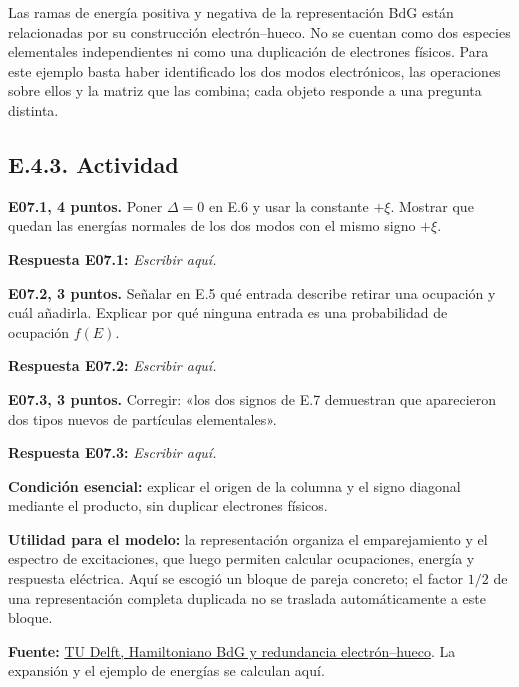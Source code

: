 \documentclass[
  spanish,
  10pt,
  a4paper,
]{article}
\begin{document}
Las ramas de energía positiva y negativa de la representación BdG están
relacionadas por su construcción electrón--hueco. No se cuentan como dos
especies elementales independientes ni como una duplicación de
electrones físicos. Para este ejemplo basta haber identificado los dos
modos electrónicos, las operaciones sobre ellos y la matriz que las
combina; cada objeto responde a una pregunta distinta.

\subsection{E.4.3. Actividad}\label{e.4.3.-actividad}


\textbf{E07.1, 4 puntos.} Poner \(\Delta=0\) en E.6 y usar la constante
\(+\xi\). Mostrar que quedan las energías normales de los dos modos con
el mismo signo \(+\xi\).

\textbf{Respuesta E07.1:} \emph{Escribir aquí.}


\textbf{E07.2, 3 puntos.} Señalar en E.5 qué entrada describe retirar
una ocupación y cuál añadirla. Explicar por qué ninguna entrada es una
probabilidad de ocupación \(f(E)\).

\textbf{Respuesta E07.2:} \emph{Escribir aquí.}


\textbf{E07.3, 3 puntos.} Corregir: «los dos signos de E.7 demuestran
que aparecieron dos tipos nuevos de partículas elementales».

\textbf{Respuesta E07.3:} \emph{Escribir aquí.}

\textbf{Condición esencial:} explicar el origen de la columna y el signo
diagonal mediante el producto, sin duplicar electrones físicos.

\textbf{Utilidad para el modelo:} la representación organiza el
emparejamiento y el espectro de excitaciones, que luego permiten
calcular ocupaciones, energía y respuesta eléctrica. Aquí se escogió un
bloque de pareja concreto; el factor \(1/2\) de una representación
completa duplicada no se traslada automáticamente a este bloque.

\textbf{Fuente:} \href{https://topocondmat.org/w1-topointro/d/}{TU
Delft, Hamiltoniano BdG y redundancia electrón--hueco}. La expansión y
el ejemplo de energías se calculan aquí.

\end{document}
